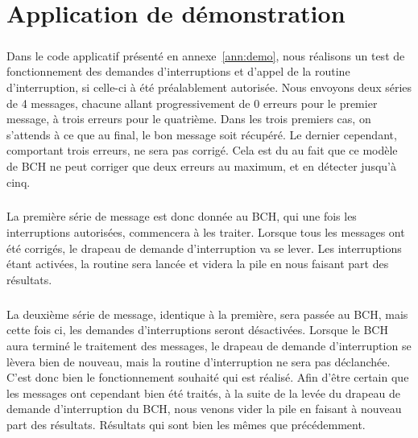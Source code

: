 \documentclass[a4paper, 11pt, svgnames]{report}
\begin{document}
    \chapter{Application de démonstration}

        \paragraph{}
        Dans le code applicatif présenté en annexe~\ref{ann:demo}, nous
        réalisons un test de fonctionnement des demandes d'interruptions et
        d'appel de la routine d'interruption, si celle-ci à été préalablement
        autorisée. Nous envoyons deux séries de 4 messages, chacune allant
        progressivement de 0 erreurs pour le premier message, à trois erreurs
        pour le quatrième. Dans les trois premiers cas, on s'attends à ce que
        au final, le bon message soit récupéré. Le dernier cependant,
        comportant trois erreurs, ne sera pas corrigé. Cela est du au fait que
        ce modèle de BCH ne peut corriger que deux erreurs au maximum, et en
        détecter jusqu'à cinq.

        \paragraph{}
        La première série de message est donc donnée au BCH, qui une fois les
        interruptions autorisées, commencera à les traiter. Lorsque tous les
        messages ont été corrigés, le drapeau de demande d'interruption va se
        lever. Les interruptions étant activées, la routine sera lancée et
        videra la pile en nous faisant part des résultats.

        \paragraph{}
        La deuxième série de message, identique à la première, sera passée au
        BCH, mais cette fois ci, les demandes d'interruptions seront
        désactivées. Lorsque le BCH aura terminé le traitement des messages,
        le drapeau de demande d'interruption se lèvera bien de nouveau, mais
        la routine d'interruption ne sera pas déclanchée. C'est donc bien le
        fonctionnement souhaité qui est réalisé. Afin d'être certain que les
        messages ont cependant bien été traités, à la suite de la levée du
        drapeau de demande d'interruption du BCH, nous venons vider la pile
        en faisant à nouveau part des résultats. Résultats qui sont bien les
        mêmes que précédemment.
\end{document}
